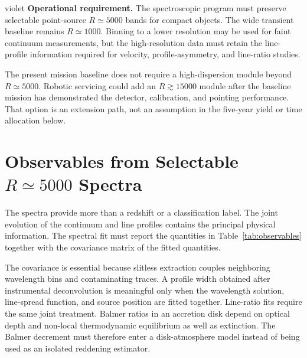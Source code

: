 \documentclass[10pt,onecolumn]{article}
\begin{document}
\begin{xresultbox}{violet}
\textbf{Operational requirement.}
The spectroscopic program must preserve selectable point-source $R\simeq5000$
bands for compact objects. The wide transient baseline remains $R\simeq1000$.
Binning to a lower resolution may be used for faint continuum measurements,
but the high-resolution data must retain the line-profile information required
for velocity, profile-asymmetry, and line-ratio studies.
\end{xresultbox}

The present mission baseline does not require a high-dispersion module beyond
$R\simeq5000$. Robotic servicing could add an $R\gtrsim15000$ module after the
baseline mission has demonstrated the detector, calibration, and pointing
performance. That option is an extension path, not an assumption in the
five-year yield or time allocation below.

\section{Observables from Selectable \texorpdfstring{$R\simeq5000$}{R approximately 5000} Spectra}

The spectra provide more than a redshift or a classification label. The joint
evolution of the continuum and line profiles contains the principal physical
information. The spectral fit must report the quantities in
Table~\ref{tab:observables} together with the covariance matrix of the fitted
quantities.

The covariance is essential because slitless extraction couples neighboring
wavelength bins and contaminating traces. A profile width obtained after
instrumental deconvolution is meaningful only when the wavelength solution,
line-spread function, and source position are fitted together. Line-ratio fits
require the same joint treatment. Balmer ratios in an accretion disk depend on
optical
depth and non-local thermodynamic equilibrium as well as extinction. The
Balmer decrement must therefore enter a disk-atmosphere model instead of being
used as an isolated reddening estimator.
\end{document}
